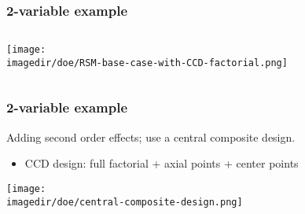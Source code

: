 \begin{frame}\frametitle{2-variable example}
	\begin{columns}
		\column{6cm}
			\begin{center}
				\texttt{[image: \\imagedir/doe/RSM-base-case-with-CCD-factorial.png]} 
			\end{center}
		\column{4cm}
	\end{columns}
\end{frame}

\begin{frame}\frametitle{2-variable example}

	Adding second order effects; use a central composite design.
	\begin{itemize}
		\item	CCD design: full factorial + axial points + center points
	\end{itemize}
	\begin{center}
		\texttt{[image: \\imagedir/doe/central-composite-design.png]}
	\end{center}
\end{frame}

